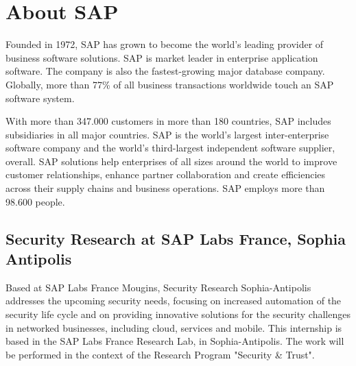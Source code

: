 \chapter*{About SAP}

Founded in 1972, SAP has grown to become the world's leading provider of business software solutions. SAP is market leader in enterprise application software. The company is also the fastest-growing major database company. Globally, more than 77\% of all business transactions worldwide touch an SAP software system.

With more than 347.000 customers in more than 180 countries, SAP includes subsidiaries in all major countries. SAP is the world's largest inter-enterprise software company and the world's third-largest independent software supplier, overall. SAP solutions help enterprises of all sizes around the world to improve customer relationships, enhance partner collaboration and create efficiencies across their supply chains and business operations. SAP employs more than 98.600 people.

\section*{Security Research at SAP Labs France, Sophia Antipolis} 

Based at SAP Labs France Mougins, Security Research Sophia-Antipolis\cite{sap} addresses the upcoming security needs, focusing on increased automation of the security life cycle and on providing innovative solutions for the security challenges in networked businesses, including cloud, services and mobile. This internship is based in the SAP Labs France Research Lab, in Sophia-Antipolis. The work will be performed in the context of the Research Program "Security {\&} Trust".